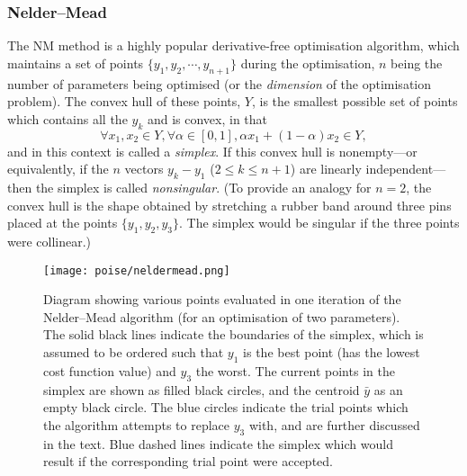 \subsubsection{Nelder--Mead}

The NM method is a highly popular derivative-free optimisation algorithm, which maintains a set of points $\{y_1, y_2, \cdots, y_{n+1}\}$ during the optimisation, $n$ being the number of parameters being optimised (or the \textit{dimension} of the optimisation problem).
The convex hull of these points, $Y$, is the smallest possible set of points which contains all the $y_k$ and is convex, in that
\begin{equation}
    \label{eq:convex_hull}
    \forall x_1, x_2 \in Y, \forall \alpha \in [0, 1], \alpha x_1 + (1 - \alpha) x_2 \in Y,
\end{equation}
and in this context is called a \textit{simplex}.
If this convex hull is nonempty---or equivalently, if the $n$ vectors $y_k - y_1$ ($2 \leq k \leq n + 1$) are linearly independent---then the simplex is called \textit{nonsingular}.
(To provide an analogy for $n = 2$, the convex hull is the shape obtained by stretching a rubber band around three pins placed at the points $\{y_1, y_2, y_3\}$.
The simplex would be singular if the three points were collinear.)

\begin{figure}[htb]
    \centering
    \texttt{[image: poise/neldermead.png]}%
    \caption[Trial points in an iteration of the Nelder--Mead algorithm]{
        Diagram showing various points evaluated in one iteration of the Nelder--Mead algorithm (for an optimisation of two parameters).
        The solid black lines indicate the boundaries of the simplex, which is assumed to be ordered such that $y_1$ is the best point (has the lowest cost function value) and $y_3$ the worst.
        The current points in the simplex are shown as filled black circles, and the centroid $\bar{y}$ as an empty black circle.
        The blue circles indicate the trial points which the algorithm attempts to replace $y_3$ with, and are further discussed in the text.
        Blue dashed lines indicate the simplex which would result if the corresponding trial point were accepted.
    }
    \label{fig:neldermead}
\end{figure}

